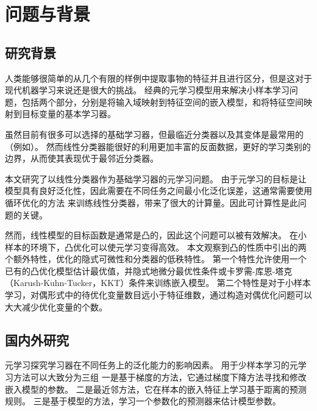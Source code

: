 
\begingroup
\let\clearpage\relax
\chapter{问题与背景}

\section{研究背景}

人类能够很简单的从几个有限的样例中提取事物的特征并且进行区分，但是这对于现代机器学习来说还是很大的挑战。
经典的元学习模型用来解决小样本学习问题，包括两个部分，分别是将输入域映射到特征空间的嵌入模型，和将特征空间映射到目标变量的基本学习器。

虽然目前有很多可以选择的基础学习器，但最临近分类器以及其变体是最常用的（例如）。
然而线性分类器能很好的利用更加丰富的反面数据，更好的学习类别的边界，从而使其表现优于最邻近分类器。

本文研究了以线性分类器作为基础学习器的元学习问题。
由于元学习的目标是让模型具有良好泛化性，因此需要在不同任务之间最小化泛化误差，这通常需要使用循环优化的方法
来训练线性分类器，带来了很大的计算量。因此可计算性是此问题的关键。

然而，线性模型的目标函数是通常是凸的，因此这个问题可以被有效解决。
在小样本的环境下，凸优化可以使元学习变得高效。
本文观察到凸的性质中引出的两个额外特性，优化的隐式可微性和分类器的低秩特性。
第一个特性允许使用一个已有的凸优化模型估计最优值，并隐式地微分最优性条件或卡罗需-库恩-塔克（Karush-Kuhn-Tucker，KKT）条件来训练嵌入模型。
第二个特性是对于小样本学习，对偶形式中的待优化变量数目远小于特征维数，通过构造对偶优化问题可以大大减少优化变量的个数。


\section{国内外研究}
元学习探究学习器在不同任务上的泛化能力的影响因素。
用于少样本学习的元学习方法可以大致分为三组
一是基于梯度的方法，它通过梯度下降方法寻找和修改嵌入模型的参数。
二是最近邻方法，它在样本的嵌入特征上学习基于距离的预测规则。
三是基于模型的方法，学习一个参数化的预测器来估计模型参数。

